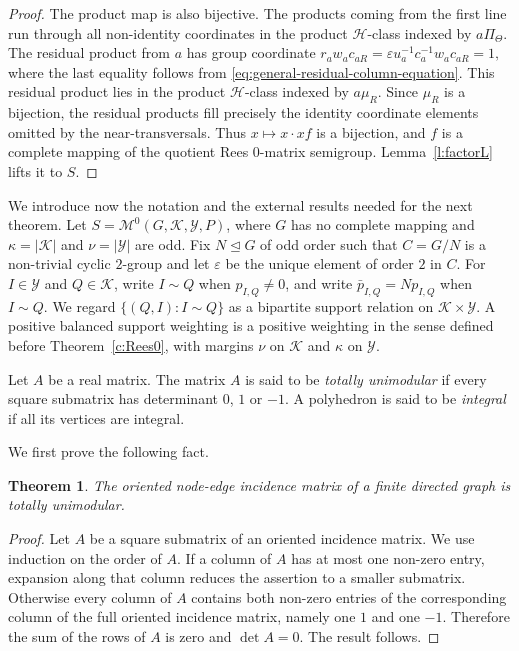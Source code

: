 \documentclass[11pt]{article}
\theoremstyle{plain}
\newtheorem{theorem}{Theorem}[section]
\theoremstyle{remark}
\theoremstyle{definition}
\theoremstyle{plain}
\begin{document}
\begin{proof}
The product map is also bijective. The products coming from the first line run
through all non-identity coordinates in the product $\mathcal H$-class indexed
by $a\Pi_\Theta$. The residual product from $a$ has group coordinate
\(r_aw_ac_{aR} = \varepsilon u_a^{-1}c_a^{-1}w_ac_{aR} =1,\)
where the last equality follows from
\eqref{eq:general-residual-column-equation}. This residual product lies in the
product $\mathcal H$-class indexed by $a\mu_R$. Since $\mu_R$ is a bijection,
the residual products fill precisely the identity coordinate elements omitted
by the near-transversals. Thus $x\mapsto x\cdot xf$ is a bijection, and $f$ is
a complete mapping of the quotient Rees $0$-matrix semigroup. Lemma~\ref{l:factorL}
lifts it to $S$.
\end{proof}


\begingroup
We introduce now the notation and the external results needed for the next
theorem. Let $S=\mathcal M^0(G,\mathcal K,\mathcal Y,P)$, where $G$ has no
complete mapping and $\kappa=|\mathcal K|$ and $\nu=|\mathcal Y|$ are odd.
Fix $N\unlhd G$ of odd order such that $C=G/N$ is a non-trivial cyclic
$2$-group and let $\varepsilon$ be the unique element of order $2$ in $C$.
For $I\in\mathcal Y$ and $Q\in\mathcal K$, write $I\sim Q$ when
$p_{I,Q}\ne0$, and write $\bar p_{I,Q}=Np_{I,Q}$ when $I\sim Q$. We regard
$\{(Q,I):I\sim Q\}$ as a bipartite support relation on
$\mathcal K\times\mathcal Y$. A positive balanced support weighting is a
positive weighting in the sense defined before Theorem~\ref{c:Rees0}, with
margins $\nu$ on $\mathcal K$ and $\kappa$ on $\mathcal Y$.

Let $A$ be a real matrix. The matrix $A$ is said to be \emph{totally
unimodular} if every square submatrix has determinant $0$, $1$ or $-1$. A
polyhedron is said to be \emph{integral} if all its vertices are integral.

We first prove the following fact.

\begin{theorem}
The oriented node-edge incidence matrix of a finite directed graph is totally
unimodular.
\end{theorem}

\begin{proof}
Let $A$ be a square submatrix of an oriented incidence matrix. We use
induction on the order of $A$. If a column of $A$ has at most one non-zero
entry, expansion along that column reduces the assertion to a smaller
submatrix. Otherwise every column of $A$ contains both non-zero entries of
the corresponding column of the full oriented incidence matrix, namely one
$1$ and one $-1$. Therefore the sum of the rows of $A$ is zero and
$\det A=0$. The result follows.
\end{proof}
\end{document}
